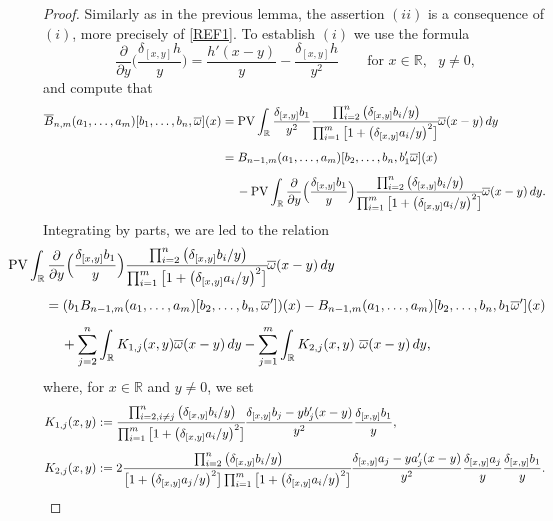 \documentclass[11pt,reqno]{amsart}
\numberwithin{equation}{section}
\newcommand{\PV}{\mathop{\rm PV}\nolimits}
\newcommand{\0}{\Omega}
\newcommand{\p}{\partial}
\newcommand{\ov}{\overline}
\newcommand{\oo}{\ov\omega}
\newcommand{\R}{\mathbb{R}}
\numberwithin{equation}{section}
\begin{document}
\begin{proof} Similarly as in the previous lemma, the assertion $(ii)$ is a consequence  of $(i)$, more precisely of \eqref{REF1}. 
To establish $(i)$ we use the formula
\[
\frac{\p}{\p y}\Big(\frac{\delta_{[x,y]}h}{y}\Big)=\frac{h'(x-y)}{y}-\frac{\delta_{[x,y]}h}{y^2}\qquad \text{for $x\in\R,$ $y\neq 0$,}
\]
and compute that 
\begin{align*}
  \ov B_{n,m}(a_1,\ldots, a_{m})[b_1,\ldots, b_n,\oo](x)&=\PV\int_\R\frac{\delta_{[x,y]} b_1}{y^2}\cfrac{\prod_{i=2}^{n}\big(\delta_{[x,y]} b_i /y\big)}{\prod_{i=1}^{m}\big[1+\big(\delta_{[x,y]}  a_i /y\big)^2\big]} \oo(x-y)\, dy\\[1ex]
  &=B_{n-1,m}(a_1,\ldots, a_{m})[b_2,\ldots, b_n,b_1'\oo](x)\\[1ex]
  &\hspace{0.424cm}-\PV\int_\R\frac{\p}{\p y}\Big(\frac{\delta_{[x,y]}b_1}{y}\Big)\cfrac{\prod_{i=2}^{n}\big(\delta_{[x,y]} b_i /y\big)}{\prod_{i=1}^{m}\big[1+\big(\delta_{[x,y]}  a_i /y\big)^2\big]} \oo(x-y)\, dy.
\end{align*}
Integrating  by parts, we are led  to the relation
\begin{align}
  &\hspace{-1cm} \PV\int_\R\frac{\p}{\p y}\Big(\frac{\delta_{[x,y]}b_1}{y}\Big)\cfrac{\prod_{i=2}^{n}\big(\delta_{[x,y]} b_i /y\big)}{\prod_{i=1}^{m}\big[1+\big(\delta_{[x,y]}  a_i /y\big)^2\big]} \oo(x-y)\, dy\nonumber\\[1ex]
  &=(b_1B_{n-1,m}(a_1,\ldots, a_{m})[b_2,\ldots, b_n, \oo'])(x)-B_{n-1,m}(a_1,\ldots, a_{m})[b_2,\ldots, b_n, b_1\oo'](x)\nonumber\\[1ex]
  &\hspace{0.424cm}+\sum_{j=2}^n\int_\R  K_{1,j}(x,y)  \oo(x-y)\, dy-\sum_{j=1}^m\int_\R K_{2,j}(x,y) \   \oo(x-y)\, dy,\label{BGG}
\end{align}
where, for $x\in\R$ and $y\neq0$, we set
\begin{align*}
 K_{1,j}(x,y)&:= \cfrac{\prod_{i=2, i\neq j }^{n}\big(\delta_{[x,y]} b_i /y\big)}{\prod_{i=1}^{m}\big[1+\big(\delta_{[x,y]}  a_i /y\big)^2\big]}\frac{\delta_{[x,y]}b_j-yb_j'(x-y)}{y^2}\frac{\delta_{[x,y]}b_1}{y},\\[1ex]
 K_{2,j}(x,y)&:= 2\cfrac{\prod_{i=2 }^{n}\big(\delta_{[x,y]} b_i /y\big)}{\big[1+\big(\delta_{[x,y]}  a_j /y\big)^2\big]\prod_{i=1}^{m}\big[1+\big(\delta_{[x,y]}  a_i /y\big)^2\big]}
  \frac{\delta_{[x,y]}a_j-ya_j'(x-y)}{y^2}\frac{\delta_{[x,y]}a_j}{y}\frac{\delta_{[x,y]}b_1}{y}.
\end{align*}

\end{proof}
\end{document}
